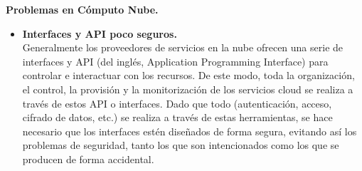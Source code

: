 \textbf{Problemas en Cómputo Nube. }

\begin{itemize}
\item \textbf {Interfaces y API poco seguros. } \\ Generalmente los proveedores de servicios en la nube ofrecen una serie de interfaces y API (del inglés, Application Programming Interface) para controlar e interactuar con los recursos. De este modo, toda la organización, el control, la provisión y la monitorización de los servicios cloud se realiza a través de estos API o interfaces. 
Dado que todo (autenticación, acceso, cifrado de datos, etc.) se realiza a través de estas herramientas, se hace necesario que los interfaces estén diseñados de forma segura, evitando así los problemas de seguridad, tanto los que son intencionados como los que se producen de forma accidental. 

\end{itemize}
